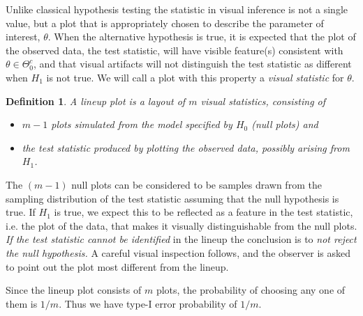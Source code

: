\documentclass{article}
\newcommand{\blue}[1]{{\color{blue} #1}}
\newtheorem{dfn}{Definition}[section]
\begin{document}
Unlike classical hypothesis testing the statistic in visual inference is not a single value, but a plot that is appropriately chosen to describe the parameter of interest, $\theta$. When the alternative hypothesis is true, it is expected that the plot of the observed data, the test statistic, will have visible feature(s) consistent with $\theta \in \Theta_0^c$, and that visual artifacts will not distinguish the test statistic as different when $H_1$ is not true. We will call a plot with this property a {\it visual statistic} for $\theta$.

\begin{dfn}\label{dfn:lplot}
A lineup plot is a layout of $m$ visual statistics, consisting of 
\begin{itemize}\itemsep-3pt
\item $m-1$ plots simulated from the model specified by $H_0$  (null plots) and 
\item the test statistic produced by plotting the observed data, possibly arising from $H_1$.
\end{itemize}
\end{dfn}

The $(m-1)$ null plots can be considered to be samples drawn from the sampling distribution of the test statistic assuming that the null hypothesis is true.
If $H_1$ is true, \blue{we expect this to be reflected as a feature in the test statistic, i.e. the plot of the data, that makes it visually distinguishable from the null plots.}
{\em If the test statistic cannot be identified} in the lineup the conclusion is to {\em not reject the null hypothesis.}  A careful visual inspection follows, and the observer is asked to point out the plot most different from the lineup.

Since the lineup plot consists of $m$ plots, the probability of choosing any one of them is $1/m$. Thus we have type-I error probability of $1/m$.



\end{document}
